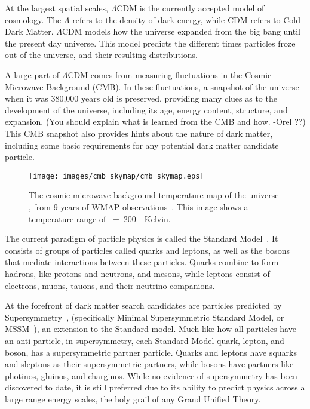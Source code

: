   At the largest spatial scales, $\Lambda$CDM is the currently accepted model of cosmology.
  The $\Lambda$ refers to the density of dark energy, while CDM refers to Cold Dark Matter.
  $\Lambda$CDM models how the universe expanded from the big bang until the present day universe.
  This model predicts the different times particles froze out of the universe, and their resulting distributions.

  A large part of $\Lambda$CDM comes from measuring fluctuations in the Cosmic Microwave Background (CMB).
  In these fluctuations, a snapshot of the universe when it was 380,000 years old is preserved, providing many clues as to the development of the universe, including its age, energy content, structure, and expansion. 
  {\color{red}(You should explain what is learned from the CMB and how. -Orel ??)}
  This CMB snapshot also provides hints about the nature of dark matter, including some basic requirements for any potential dark matter candidate particle.

  \begin{figure}[ht]
    \texttt{[image: images/cmb\_skymap/cmb\_skymap.eps]}
    \caption[The Cosmic Microwave Background]{
      The cosmic microwave background temperature map of the universe \cite{wmap_skymap}, from 9 years of WMAP observations~\cite{wmap9year}.
      This image shows a temperature range of \SI{\pm200}{\mu{}Kelvin}.
    }
    \label{fig:cmb}
  \end{figure}

  The current paradigm of particle physics is called the Standard Model~\cite{standardmodel}.
  It consists of groups of particles called quarks and leptons, as well as the bosons that mediate interactions between these particles.
  Quarks combine to form hadrons, like protons and neutrons, and mesons, while leptons consist of electrons, muons, tauons, and their neutrino companions.

  At the forefront of dark matter search candidates are particles predicted by Supersymmetry~\cite{Jungman:1995df}, (specifically Minimal Supersymmetric Standard Model, or MSSM~\cite{MSSM,supersym1}), an extension to the Standard model.
  Much like how all particles have an anti-particle, in supersymmetry, each Standard Model quark, lepton, and boson, has a supersymmetric partner particle.
  Quarks and leptons have squarks and sleptons as their supersymmetric partners, while bosons have partners like photinos, gluinos, and charginos.
  While no evidence of supersymmetry has been discovered to date, it is still preferred due to its ability to predict physics across a large range energy scales, the holy grail of any Grand Unified Theory.
  

